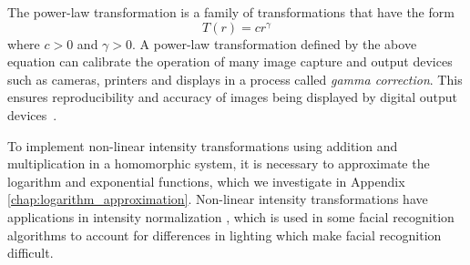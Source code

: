 The power-law transformation is a family of transformations that have the form
\begin{equation}
    T\left(r\right) = c r^{\gamma}
\end{equation}
where $c>0$ and $\gamma > 0$.
A power-law transformation defined by the above equation can calibrate the operation of many image capture and output devices such as cameras, printers and displays in a process called \textit{gamma correction}. This ensures reproducibility and accuracy of images being displayed by digital output devices~\cite{gonzalez_digital_2008}.

To implement non-linear intensity transformations using addition and multiplication in a homomorphic system, it is necessary to approximate the logarithm and exponential functions, which we investigate in Appendix \ref{chap:logarithm_approximation}. Non-linear intensity transformations have applications in intensity normalization \cite{oravec_illumination_2010}, which is used in some facial recognition algorithms to account for differences in lighting which make facial recognition difficult.



